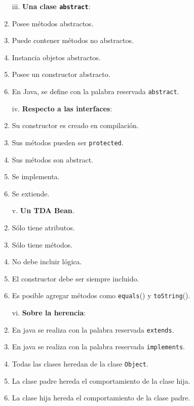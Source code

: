 \documentclass[10pt]{article}
\begin{document}
{\begin{enumerate}
\begin{multicols}{2}
			\begin{enumerate}[label=(\alph*)]
				 \item[iii.] \textbf{Una clase \texttt{abstract}}:
				 \item Posee m\'etodos abstractos.
				 \item Puede contener m\'etodos no abstractos.
				 \item Instancia objetos abstractos.
				 \item Posee un constructor abstracto.
				 \item En Java, se define con la palabra reservada \texttt{abstract}.
			\end{enumerate}

            \begin{enumerate}[label=(\alph*)]
				 \item[iv.] \textbf{Respecto a las interfaces}:
				 \item Su constructor es creado en compilaci\'on.
				 \item Sus m\'etodos pueden ser \texttt{protected}.
				 \item Sus m\'etodos son abstract.
				 \item Se implementa.
				 \item Se extiende.
			\end{enumerate}

			\begin{enumerate}[label=(\alph*)]
				\item[v.] \textbf{Un TDA Bean}.
				\item S\'olo tiene atributos.
				\item S\'olo tiene m\'etodos.
				\item No debe incluir l\'ogica.
				\item El constructor debe ser siempre incluido.
				\item Es posible agregar m\'etodos como \texttt{equals}() y \texttt{toString}().
			\end{enumerate}

			\begin{enumerate}[label=(\alph*)]
				\item[vi.] \textbf{Sobre la herencia}:
				\item En java se realiza con la palabra reservada \texttt{extends}.
				\item En java se realiza con la palabra reservada \texttt{implements}.
				\item Todas las clases heredan de la clase \texttt{Object}.
				\item La clase padre hereda el comportamiento de la clase hija.
				\item La clase hija hereda el comportamiento de la clase padre.
			\end{enumerate}


\end{multicols}
\end{enumerate}}
\end{document}
